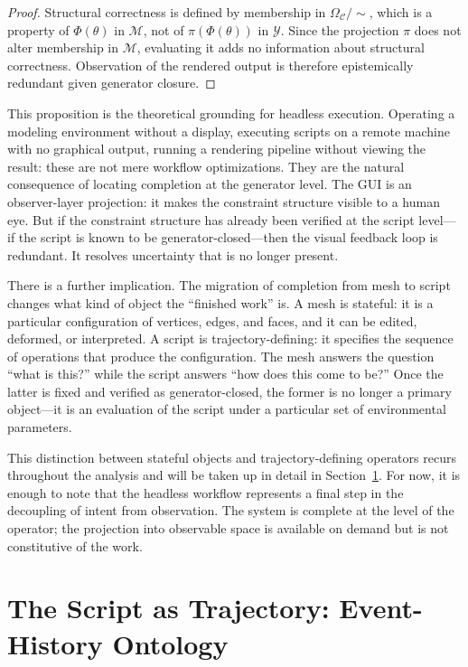 \documentclass[11pt, twoside]{article}
\theoremstyle{plain}
\theoremstyle{definition}
\theoremstyle{remark}
\newcommand{\OmC}{\Omega_{\mathcal{C}}}
\begin{document}
\begin{proof}
Structural correctness is defined by membership in $\OmC / {\sim}$, which is a property of $\Phi(\theta)$ in $\mathcal{M}$, not of $\pi(\Phi(\theta))$ in $\mathcal{Y}$. Since the projection $\pi$ does not alter membership in $\mathcal{M}$, evaluating it adds no information about structural correctness. Observation of the rendered output is therefore epistemically redundant given generator closure.
\end{proof}

This proposition is the theoretical grounding for headless execution. Operating a modeling environment without a display, executing scripts on a remote machine with no graphical output, running a rendering pipeline without viewing the result: these are not mere workflow optimizations. They are the natural consequence of locating completion at the generator level. The GUI is an observer-layer projection: it makes the constraint structure visible to a human eye. But if the constraint structure has already been verified at the script level---if the script is known to be generator-closed---then the visual feedback loop is redundant. It resolves uncertainty that is no longer present.

There is a further implication. The migration of completion from mesh to script changes what kind of object the ``finished work'' is. A mesh is stateful: it is a particular configuration of vertices, edges, and faces, and it can be edited, deformed, or interpreted. A script is trajectory-defining: it specifies the sequence of operations that produce the configuration. The mesh answers the question ``what is this?'' while the script answers ``how does this come to be?'' Once the latter is fixed and verified as generator-closed, the former is no longer a primary object---it is an evaluation of the script under a particular set of environmental parameters.

This distinction between stateful objects and trajectory-defining operators recurs throughout the analysis and will be taken up in detail in Section~\ref{sec:trajectory}. For now, it is enough to note that the headless workflow represents a final step in the decoupling of intent from observation. The system is complete at the level of the operator; the projection into observable space is available on demand but is not constitutive of the work.

\section{The Script as Trajectory: Event-History Ontology}
\label{sec:trajectory}
\end{document}
